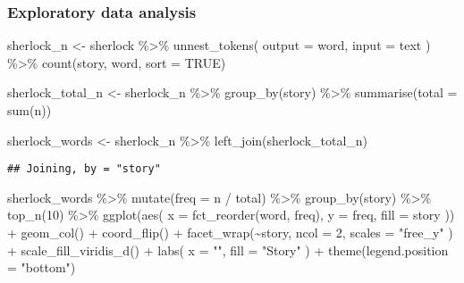 \documentclass[
]{book}
\newenvironment{Shaded}{\begin{snugshade}}{\end{snugshade}}
\newcommand{\AttributeTok}[1]{\textcolor[rgb]{0.77,0.63,0.00}{#1}}
\newcommand{\ConstantTok}[1]{\textcolor[rgb]{0.00,0.00,0.00}{#1}}
\newcommand{\DecValTok}[1]{\textcolor[rgb]{0.00,0.00,0.81}{#1}}
\newcommand{\FunctionTok}[1]{\textcolor[rgb]{0.00,0.00,0.00}{#1}}
\newcommand{\NormalTok}[1]{#1}
\newcommand{\OtherTok}[1]{\textcolor[rgb]{0.56,0.35,0.01}{#1}}
\newcommand{\SpecialCharTok}[1]{\textcolor[rgb]{0.00,0.00,0.00}{#1}}
\newcommand{\StringTok}[1]{\textcolor[rgb]{0.31,0.60,0.02}{#1}}
\begin{document}
\hypertarget{exploratory-data-analysis}{%
\subsubsection{Exploratory data analysis}\label{exploratory-data-analysis}}

\begin{Shaded}
\begin{Highlighting}[]
\NormalTok{sherlock\_n }\OtherTok{\textless{}{-}}\NormalTok{ sherlock }\SpecialCharTok{\%\textgreater{}\%}
  \FunctionTok{unnest\_tokens}\NormalTok{(}
    \AttributeTok{output =}\NormalTok{ word,}
    \AttributeTok{input =}\NormalTok{ text}
\NormalTok{  ) }\SpecialCharTok{\%\textgreater{}\%}
  \FunctionTok{count}\NormalTok{(story, word, }\AttributeTok{sort =} \ConstantTok{TRUE}\NormalTok{)}

\NormalTok{sherlock\_total\_n }\OtherTok{\textless{}{-}}\NormalTok{ sherlock\_n }\SpecialCharTok{\%\textgreater{}\%}
  \FunctionTok{group\_by}\NormalTok{(story) }\SpecialCharTok{\%\textgreater{}\%}
  \FunctionTok{summarise}\NormalTok{(}\AttributeTok{total =} \FunctionTok{sum}\NormalTok{(n))}

\NormalTok{sherlock\_words }\OtherTok{\textless{}{-}}\NormalTok{ sherlock\_n }\SpecialCharTok{\%\textgreater{}\%}
  \FunctionTok{left\_join}\NormalTok{(sherlock\_total\_n)}
\end{Highlighting}
\end{Shaded}

\begin{verbatim}
## Joining, by = "story"
\end{verbatim}

\begin{Shaded}
\begin{Highlighting}[]
\NormalTok{sherlock\_words }\SpecialCharTok{\%\textgreater{}\%}
  \FunctionTok{mutate}\NormalTok{(}\AttributeTok{freq =}\NormalTok{ n }\SpecialCharTok{/}\NormalTok{ total) }\SpecialCharTok{\%\textgreater{}\%}
  \FunctionTok{group\_by}\NormalTok{(story) }\SpecialCharTok{\%\textgreater{}\%}
  \FunctionTok{top\_n}\NormalTok{(}\DecValTok{10}\NormalTok{) }\SpecialCharTok{\%\textgreater{}\%}
  \FunctionTok{ggplot}\NormalTok{(}\FunctionTok{aes}\NormalTok{(}
    \AttributeTok{x =} \FunctionTok{fct\_reorder}\NormalTok{(word, freq),}
    \AttributeTok{y =}\NormalTok{ freq,}
    \AttributeTok{fill =}\NormalTok{ story}
\NormalTok{  )) }\SpecialCharTok{+}
  \FunctionTok{geom\_col}\NormalTok{() }\SpecialCharTok{+}
  \FunctionTok{coord\_flip}\NormalTok{() }\SpecialCharTok{+}
  \FunctionTok{facet\_wrap}\NormalTok{(}\SpecialCharTok{\textasciitilde{}}\NormalTok{story,}
    \AttributeTok{ncol =} \DecValTok{2}\NormalTok{,}
    \AttributeTok{scales =} \StringTok{"free\_y"}
\NormalTok{  ) }\SpecialCharTok{+}
  \FunctionTok{scale\_fill\_viridis\_d}\NormalTok{() }\SpecialCharTok{+}
  \FunctionTok{labs}\NormalTok{(}
    \AttributeTok{x =} \StringTok{""}\NormalTok{,}
    \AttributeTok{fill =} \StringTok{"Story"}
\NormalTok{  ) }\SpecialCharTok{+}
  \FunctionTok{theme}\NormalTok{(}\AttributeTok{legend.position =} \StringTok{"bottom"}\NormalTok{)}
\end{Highlighting}
\end{Shaded}
\end{document}
